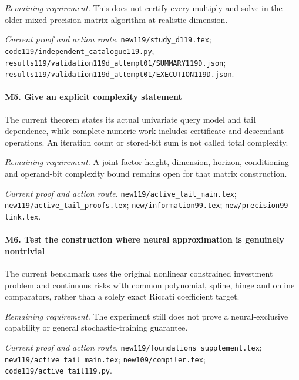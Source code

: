 \par\emph{Remaining requirement.} This does not certify every multiply and solve in the older mixed-precision matrix algorithm at realistic dimension.

\par\emph{Current proof and action route.} \nolinkurl{new119/study_d119.tex}; \nolinkurl{code119/independent_catalogue119.py}; \nolinkurl{results119/validation119d_attempt01/SUMMARY119D.json}; \nolinkurl{results119/validation119d_attempt01/EXECUTION119D.json}.

\paragraph{M5. Give an explicit complexity statement}

The current theorem states its actual univariate query model and tail dependence, while complete numeric work includes certificate and descendant operations. An iteration count or stored-bit sum is not called total complexity.

\par\emph{Remaining requirement.} A joint factor-height, dimension, horizon, conditioning and operand-bit complexity bound remains open for that matrix construction.

\par\emph{Current proof and action route.} \nolinkurl{new119/active_tail_main.tex}; \nolinkurl{new119/active_tail_proofs.tex}; \nolinkurl{new/information99.tex}; \nolinkurl{new/precision99-link.tex}.

\paragraph{M6. Test the construction where neural approximation is genuinely nontrivial}

The current benchmark uses the original nonlinear constrained investment problem and continuous risks with common polynomial, spline, hinge and online comparators, rather than a solely exact Riccati coefficient target.

\par\emph{Remaining requirement.} The experiment still does not prove a neural-exclusive capability or general stochastic-training guarantee.

\par\emph{Current proof and action route.} \nolinkurl{new119/foundations_supplement.tex}; \nolinkurl{new119/active_tail_main.tex}; \nolinkurl{new109/compiler.tex}; \nolinkurl{code119/active_tail119.py}.

